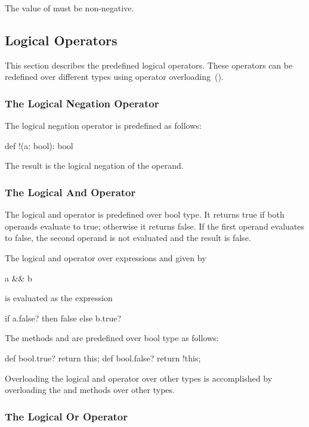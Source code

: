 The value of  must be non-negative.

\subsection{Logical Operators}
\label{Logical_Operators}

This section describes the predefined logical operators.  These
operators can be redefined over different types using operator
overloading~().

\subsubsection{The Logical Negation Operator}
\label{Logical_Negation_Operators}

The logical negation operator is predefined as follows:
\begin{chapel}
def !(a: bool): bool
\end{chapel}
The result is the logical negation of the operand.

\subsubsection{The Logical And Operator}
\label{Logical_And_Operators}

The logical and operator is predefined over bool type.  It returns
true if both operands evaluate to true; otherwise it returns false.
If the first operand evaluates to false, the second operand is not
evaluated and the result is false.

The logical and operator over expressions  and  given
by
\begin{chapel}
a && b
\end{chapel}
is evaluated as the expression
\begin{chapel}
if a.false? then false else b.true?
\end{chapel}

The methods  and  are predefined over bool
type as follows:
\begin{chapel}
def bool.true? return this;
def bool.false? return !this;
\end{chapel}
Overloading the logical and operator over other types is accomplished
by overloading the  and  methods over other
types.

\subsubsection{The Logical Or Operator}
\label{Logical_Or_Operators}

